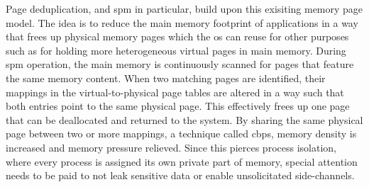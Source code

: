 Page deduplication, and \ac{spm} in particular, build upon this exisiting memory page model.
The idea is to reduce the main memory footprint of applications in a way that frees up physical memory pages which the \ac{os} can reuse for other purposes such as for holding more heterogeneous virtual pages in main memory.
During \ac{spm} operation, the main memory is continuously scanned for pages that feature the same memory content.
When two matching pages are identified, their mappings in the virtual-to-physical page tables are altered in a way such that both entries point to the same physical page.
This effectively frees up one page that can be deallocated and returned to the system.
By sharing the same physical page between two or more mappings, a technique called \ac{cbps}, memory density is increased and memory pressure relieved.
Since this pierces process isolation, where every process is assigned its own private part of memory, special attention needs to be paid to not leak sensitive data or enable unsolicitated side-channels.
